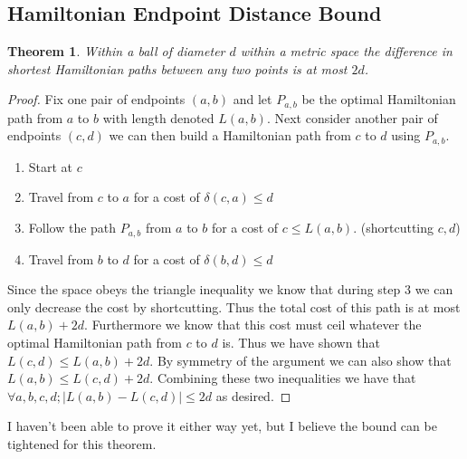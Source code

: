 \documentclass{article}
\newtheorem{thm}{Theorem}[section]
\theoremstyle{definition}
\newcommand{\dist}{\delta}
\begin{document}
\subsection{Hamiltonian Endpoint Distance Bound}

\begin{thm}
Within a ball of diameter $d$ within a metric space the difference in shortest Hamiltonian paths between any two points is at most $2d$.
\end{thm}
\begin{proof}
    Fix one pair of endpoints $(a,b)$ and let $P_{a,b}$ be the optimal Hamiltonian path from $a$ to $b$ with length denoted $L(a,b)$.
    Next consider another pair of endpoints $(c,d)$ we can then build a Hamiltonian path from $c$ to $d$ using $P_{a,b}$.
    \begin{enumerate}
        \item Start at $c$
        \item Travel from $c$ to $a$ for a cost of $\dist(c,a) \leq d$
        \item Follow the path $P_{a,b}$ from $a$ to $b$ for a cost of $c \leq L(a,b)$. (shortcutting $c,d$)
        \item Travel from $b$ to $d$ for a cost of $\dist(b,d) \leq d$
    \end{enumerate}
    Since the space obeys the triangle inequality we know that during step 3 we can only decrease the cost by shortcutting. 
    Thus the total cost of this path is at most $L(a,b) + 2d$. 
    Furthermore we know that this cost must ceil whatever the optimal Hamiltonian path from $c$ to $d$ is. 
    Thus we have shown that $L(c,d) \leq L(a,b) + 2d$. 
    By symmetry of the argument we can also show that $L(a,b) \leq L(c,d) + 2d$. 
    Combining these two inequalities we have that $\forall a,b,c,d;|L(a,b) - L(c,d)| \leq 2d$ as desired. 
\end{proof}
I haven't been able to prove it either way yet, but I believe the bound can be tightened for this theorem. 
\end{document}
